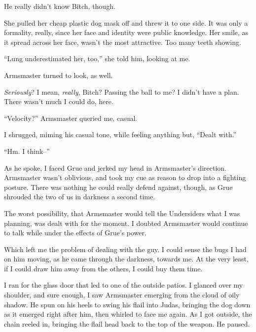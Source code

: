 He really didn't know Bitch, though.



She pulled her cheap plastic dog mask off and threw it to one side.  It was only a formality, really, since her face and identity were public knowledge.  Her smile, as it spread across her face, wasn't the most attractive.  Too many teeth showing.



``Lung underestimated her, too,'' she told him, looking at me.



Armsmaster turned to look, as well.



\emph{Seriously}?  I mean, \emph{really}, Bitch?  Passing the ball to me?  I didn't have a plan.  There wasn't much I could do, here.



``Velocity?''  Armsmaster queried me, casual.



I shrugged, miming his casual tone, while feeling anything but, ``Dealt with.''



``Hm.  I think--''



As he spoke, I faced Grue and jerked my head in Armsmaster's direction.  Armsmaster wasn't oblivious, and took my cue as reason to drop into a fighting posture.  There was nothing he could really defend against, though, as Grue shrouded the two of us in darkness a second time.



The worst possibility, that Armsmaster would tell the Undersiders what I was planning, was dealt with for the moment.  I doubted Armsmaster would continue to talk while under the effects of Grue's power.



Which left me the problem of dealing with the guy.  I could sense the bugs I had on him moving, as he came through the darkness, towards me.  At the very least, if I could draw him away from the others, I could buy them time.



I ran for the glass door that led to one of the outside patios.  I glanced over my shoulder, and sure enough, I saw Armsmaster emerging from the cloud of oily shadow.  He spun on his heels to swing his flail into Judas, bringing the dog down as it emerged right after him, then whirled to face me again.  As I got outside, the chain reeled in, bringing the flail head back to the top of the weapon.  He paused.



